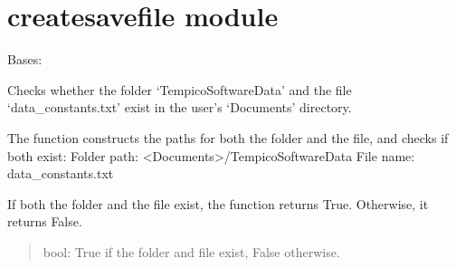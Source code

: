 \documentclass[letterpaper,10pt,english]{sphinxmanual}
\begin{document}
\sphinxstepscope


\chapter{createsavefile module}
\label{\detokenize{createsavefile:module-createsavefile}}\label{\detokenize{createsavefile:createsavefile-module}}\label{\detokenize{createsavefile::doc}}

\begin{fulllineitems}
\label{\detokenize{createsavefile:createsavefile.createsavefile}}
\pysigstartsignatures
{}
\pysigstopsignatures
\sphinxAtStartPar
Bases: 

\begin{fulllineitems}
\label{\detokenize{createsavefile:createsavefile.createsavefile.check_folder_and_file}}
\pysigstartsignatures
{}
\pysigstopsignatures
\sphinxAtStartPar
Checks whether the folder ‘TempicoSoftwareData’ and the file ‘data\_constants.txt’ 
exist in the user’s ‘Documents’ directory.

\sphinxAtStartPar
The function constructs the paths for both the folder and the file, and checks if both exist:
\sphinxhyphen{} Folder path: \textless{}Documents\textgreater{}/TempicoSoftwareData
\sphinxhyphen{} File name: data\_constants.txt

\sphinxAtStartPar
If both the folder and the file exist, the function returns True. Otherwise, it returns False.
\begin{quote}\begin{description}
\sphinxAtStartPar
bool: True if the folder and file exist, False otherwise.

\end{description}\end{quote}

\end{fulllineitems}


\end{fulllineitems}
\end{document}
